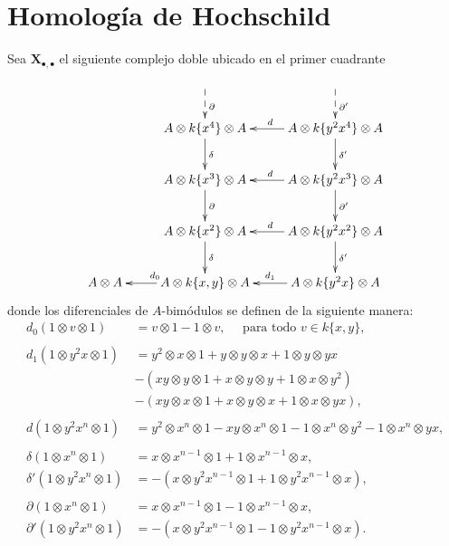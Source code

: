 \documentclass[a4paper,oneside,fleqn,11pt]{article}
\newcommand\ox{\otimes}
\numberwithin{prop}{subsection}
\begin{document}
\section{Homología de Hochschild}
Sea $\mathbf{X}_{\bullet,\bullet}$ el siguiente complejo doble ubicado en el primer cuadrante
\begin{align*}
\xymatrix{
	& & \\
	& A \ox k\{x^4\} \ox A \ar[d]^{\delta} \ar@{<--}[u]_{\partial} & A \ox k\{y^2x^4\} \ox A \ar[l]_d \ar[d]^{\delta'} \ar@{<--}[u]_{\partial'} \\
	& A \ox k\{x^3\} \ox A \ar[d]^{\partial} & A \ox k\{y^2x^3\} \ox A \ar[l]_d \ar[d]^{\partial'} \\
	& A \ox k\{x^2\} \ox A \ar[d]^{\delta} & A \ox k \{y^2x^2\} \ox A \ar[l]_d \ar[d]^{\delta'} \\
	A \ox A & A \ox k\{x, y\} \ox A \ar[l]_{d_0} & A \ox k \{y^2x\} \ox A \ar[l]_{d_1} \\
}
\end{align*}
donde los diferenciales de $A$-bimódulos se definen de la siguiente manera:
\begin{align*}
	d_0(1 \ox v \ox 1) &= v \ox 1 - 1 \ox v, \quad\text{ para todo } v \in k\{x, y\}, \\
	\\
	d_1(1 \ox y^2x \ox 1) &= y^2 \ox x \ox 1 + y \ox y \ox x + 1 \ox y \ox yx \\
		&-(xy \ox y \ox 1 + x \ox y \ox y + 1 \ox x \ox y^2) \\
		&-(xy \ox x \ox 1 + x \ox y \ox x + 1 \ox x \ox yx), \\
	\\	
	d(1 \ox y^2x^n \ox 1) &= y^2 \ox x^n \ox 1 - xy \ox x^n \ox 1 - 1 \ox x^n \ox y^2 - 1 \ox x^n \ox yx,\\
	\\	
	\delta(1 \ox x^n \ox 1) &= x \ox x^{n -1} \ox 1 + 1 \ox x^{n - 1} \ox x,\\
	\delta'(1 \ox y^2x^n \ox 1) &= - (x \ox y^2 x^{n -1} \ox 1 + 1 \ox y^2x^{n - 1} \ox x),\\
	\\	
	\partial(1 \ox x^n \ox 1) &= x \ox x^{n -1} \ox 1 - 1 \ox x^{n - 1} \ox x,\\
	\partial'(1 \ox y^2x^n \ox 1) &= -(x \ox y^2 x^{n -1} \ox 1 - 1 \ox y^2x^{n - 1} \ox x). \\
\end{align*}
\end{document}
